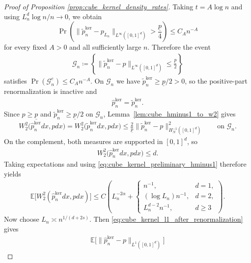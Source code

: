 \documentclass[11pt,reqno]{amsart}
\theoremstyle{definition}
\renewcommand{\hat}{\widehat}
\renewcommand{\tilde}{\widetilde}
\newcommand{\Ep}{\mathbb{E}}
\begin{document}
\begin{proof}[Proof of Proposition \ref{prop:cube_kernel_density_rates}]
Taking $t=A\log n$ and using $L_n^d\log n/n\to 0$, we obtain
\begin{equation}\label{eq:bern}
    \Pr\left(
        \|\tilde p_n^{\mathrm{ker}}-p_{L_n}\|_{L^\infty([0,1]^d)}
        >
        \frac{\underline p}{4}
    \right)
    \le
    C_A n^{-A}
\end{equation}
for every fixed $A>0$ and all sufficiently large $n$.
Therefore the event
\begin{align*}
    \mathcal G_n
    \coloneqq
    \left\{
        \|\tilde p_n^{\mathrm{ker}}-p\|_{L^\infty([0,1]^d)}
        \le
        \frac{\underline p}{2}
    \right\}
\end{align*}
satisfies $\Pr(\mathcal G_n^c)\le C_A n^{-A}$.
On $\mathcal G_n$ we have $\tilde p_n^{\mathrm{ker}}\ge \underline p/2>0$, so the positive-part renormalization is inactive and
\begin{align*}
    \hat p_n^{\mathrm{ker}}
    =
    \tilde p_n^{\mathrm{ker}}.
\end{align*}
Since $p\ge \underline p$ and $\tilde p_n^{\mathrm{ker}}\ge \underline p/2$ on $\mathcal G_n$, Lemma~\ref{lem:cube_hminus1_to_w2} gives
\begin{align*}
    W_2^2\bigl(\hat p_n^{\mathrm{ker}}dx,p dx\bigr)
    =
    W_2^2\bigl(\tilde p_n^{\mathrm{ker}}dx,p dx\bigr)
    \le
    \frac{2}{\underline p}
    \|\tilde p_n^{\mathrm{ker}}-p\|_{H^{-1}_N([0,1]^d)}^2
    \qquad \text{on }\mathcal G_n.
\end{align*}
On the complement, both measures are supported in $[0,1]^d$, so
\begin{align*}
    W_2^2\bigl(\hat p_n^{\mathrm{ker}}dx,p dx\bigr)
    \le d.
\end{align*}
Taking expectations and using \eqref{eq:cube_kernel_preliminary_hminus1} therefore yields
\begin{align}
\label{eq:cube_kernel_w2_probability}
    \Ep\bigl[W_2^2(\hat p_n^{\mathrm{ker}}dx,p dx)\bigr]
    \le
    C\left(
        L_n^{-2\alpha}
        +
        \begin{cases}
            n^{-1}, & d=1,
            \\
            (\log L_n)n^{-1}, & d=2,
            \\
            L_n^{d-2}n^{-1}, & d\ge 3
        \end{cases}
    \right).
\end{align}
Now choose $L_n\asymp n^{1/(d+2s)}$.
Then \eqref{eq:cube_kernel_l1_after_renormalization} gives
\begin{align*}
    \Ep\bigl[\|\hat p_n^{\mathrm{ker}}-p\|_{L^1([0,1]^d)}\bigr]

\end{align*}
\end{proof}
\end{document}
